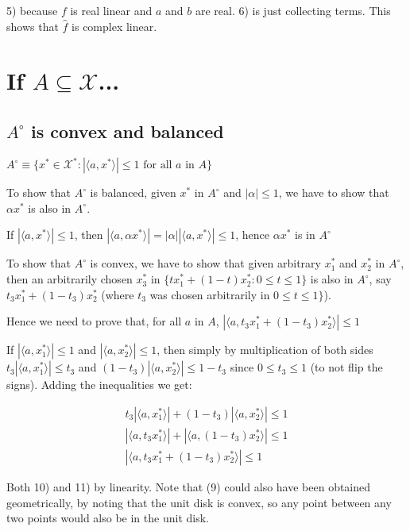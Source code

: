 \documentclass{article}
\begin{document}
5) because $f$ is real linear and $a$ and $b$ are real. 6) is just collecting terms. This shows that $\hat{f}$ is complex linear.

\section{If $A \subseteq  \mathscr{X}$...}

\subsection{$A^{\circ}$ is convex and balanced}

$A^{\circ} \equiv \{x^*\in \mathscr{X}^*: | \langle a, x^*\rangle | \le 1 \text{ for all } a \text{ in } A\}$

To show that $A^{\circ}$ is balanced, given $x^*$ in $A^{\circ}$ and $|\alpha| \le 1$, we have to show that $\alpha x^*$ is also in $A^{\circ}$.

If $|\langle a, x^*\rangle | \le 1$, then $|\langle a, \alpha x^*\rangle | = |\alpha |  | \langle a, x^* \rangle | \le 1$, hence $\alpha x^*$ is in $A^{\circ}$

To show that $A^{\circ}$ is convex, we have to show that given arbitrary $x_1^*$ and $x_2^*$ in $A^{\circ}$, then an arbitrarily chosen $x_3^*$ in $\{t x_1^* + (1-t) x_2^* :0\le t \le 1\}$ is also in $A^{\circ}$, say $t_3 x_1^* + (1-t_3) x_2^*$ (where $t_3$ was chosen arbitrarily in $0\le t \le 1\}$).

Hence we need to prove that, for all $a$ in $A$, $|\langle a, t_3 x_1^* + (1-t_3) x_2^* \rangle | \le 1$

If $|\langle a, x_1^*\rangle | \le 1$ and $|\langle a, x_2^*\rangle | \le 1$, then simply by multiplication of both sides $t_3|\langle a, x_1^*\rangle | \le t_3$ and $(1-t_3)|\langle a, x_2^*\rangle | \le 1-t_3$ since $0 \le t_3 \le 1$ (to not flip the signs). Adding the inequalities we get:

\begin{align}
t_3|\langle a, x_1^*\rangle | +(1-t_3)|\langle a, x_2^*\rangle | \le 1 \\
|\langle a, t_3 x_1^*\rangle | +|\langle a, (1-t_3) x_2^*\rangle | \le 1 \\
|\langle a, t_3 x_1^* + (1-t_3) x_2^*\rangle | \le 1
\end{align}

Both 10) and 11) by linearity. Note that (9) could also have been obtained geometrically, by noting that the unit disk is convex, so any point between any two points would also be in the unit disk.
\end{document}
